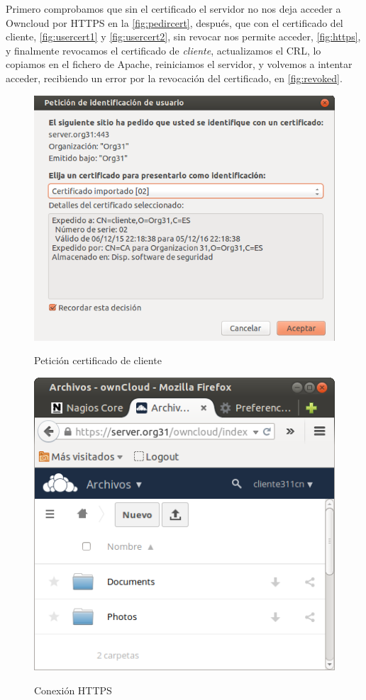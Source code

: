 \documentclass[]{article}
\begin{document}
Primero comprobamos que sin el certificado el servidor no nos deja acceder a Owncloud por HTTPS en la \autoref{fig:pedircert}, después, que con el certificado del cliente, \autoref{fig:usercert1} y \autoref{fig:usercert2}, sin revocar nos permite acceder,  \autoref{fig:https}, y finalmente revocamos el certificado de \textit{cliente}, actualizamos el CRL, lo copiamos en el fichero de Apache, reiniciamos el servidor, y volvemos a intentar acceder, recibiendo un error por la revocación del certificado, en \autoref{fig:revoked}.


\begin{figure}[h]
	\caption{Petición certificado de cliente}
	\centering
	\includegraphics[scale=0.5]{images/certs/pedircert.png}
	\label{fig:pedircert}
\end{figure}


\begin{figure}[h]
	\caption{Conexión HTTPS}
	\centering
	\includegraphics[scale=0.5]{images/certs/https.png}
	\label{fig:https}
\end{figure}
\end{document}
